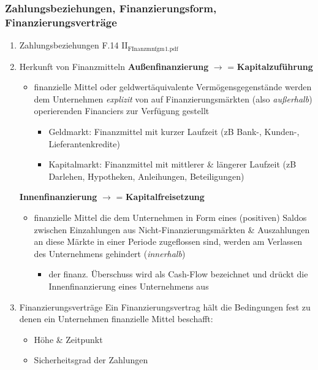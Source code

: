 \documentclass[11pt]{article}
\begin{document}
\subsubsection{Zahlungsbeziehungen, Finanzierungsform, Finanzierungsverträge}
\label{sec:org71684f6}
\begin{enumerate}
\item Zahlungsbeziehungen
\label{sec:org2e27929}
F.14 II\(_{\text{FInanzmnfgm}}\)\(_{\text{1.pdf}}\)
\item Herkunft von Finanzmitteln
\label{sec:org879cac8}
\textbf{Außenfinanzierung} \(\rightarrow\) = \textbf{Kapitalzuführung}
\begin{itemize}
\item finanzielle Mittel oder geldwertäquivalente Vermögensgegenstände werden dem Unternehmen \emph{explizit} von auf Finanzierungsmärkten (also \emph{außerhalb}) operierenden Financiers zur Verfügung gestellt
\begin{itemize}
\item Geldmarkt: Finanzmittel mit kurzer Laufzeit (zB Bank-, Kunden-, Lieferantenkredite)
\item Kapitalmarkt: Finanzmittel mit mittlerer \& längerer Laufzeit (zB Darlehen, Hypotheken, Anleihungen, Beteiligungen)
\end{itemize}
\end{itemize}

\textbf{Innenfinanzierung} \(\rightarrow\) = \textbf{Kapitalfreisetzung}
\begin{itemize}
\item finanzielle Mittel die dem Unternehmen in Form eines (positiven) Saldos zwischen Einzahlungen aus Nicht-Finanzierungsmärkten \& Auszahlungen an diese Märkte in einer Periode zugeflossen sind, werden am Verlassen des Unternehmens gehindert (\emph{innerhalb})
\begin{itemize}
\item der finanz. Überschuss wird als Cash-Flow bezeichnet und drückt die Innenfinanzierung eines Unternehmens aus
\end{itemize}
\end{itemize}
\item Finanzierungsverträge
\label{sec:org2ac5b82}
Ein Finanzierungsvertrag hält die Bedingungen fest zu denen ein Unternehmen finanzielle Mittel beschafft:
\begin{itemize}
\item Höhe \& Zeitpunkt
\item Sicherheitsgrad der Zahlungen
\end{itemize}


\end{enumerate}
\end{document}
